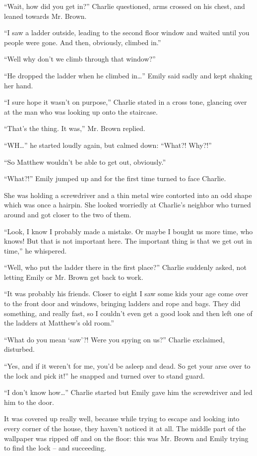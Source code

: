 “Wait, how did you get in?” Charlie questioned, arms crossed on his chest, and leaned towards Mr. Brown.

“I saw a ladder outside, leading to the second floor window and waited until you people were gone. And then, obviously, climbed in.”

“Well why don't we climb through that window?”

“He dropped the ladder when he climbed in…” Emily said sadly and kept shaking her hand.

“I sure hope it wasn't on purpose,” Charlie stated in a cross tone, glancing over at the man who was looking up onto the staircase.

“That's the thing. It was,” Mr. Brown replied.

“WH…” he started loudly again, but calmed down: “What?! Why?!”

“So Matthew wouldn't be able to get out, obviously.”

“What?!” Emily jumped up and for the first time turned to face Charlie.

She was holding a screwdriver and a thin metal wire contorted into an odd shape which was once a hairpin. She looked worriedly at Charlie's neighbor who turned around and got closer to the two of them.

“Look, I know I probably made a mistake. Or maybe I bought us more time, who knows! But that is not important here. The important thing is that we get out in time,” he whispered.

“Well, who put the ladder there in the first place?” Charlie suddenly asked, not letting Emily or Mr. Brown get back to work.

“It was probably his friends. Closer to eight I saw some kids your age come over to the front door and windows, bringing ladders and rope and bags. They did something, and really fast, so I couldn't even get a good look and then left one of the ladders at Matthew's old room.”

“What do you mean ‘saw'?! Were you spying on us?” Charlie exclaimed, disturbed.

“Yes, and if it weren't for me, you'd be asleep and dead. So get your arse over to the lock and pick it!” he snapped and turned over to stand guard.

“I don't know how…” Charlie started but Emily gave him the screwdriver and led him to the door.

It was covered up really well, because while trying to escape and looking into every corner of the house, they haven't noticed it at all. The middle part of the wallpaper was ripped off and on the floor: this was Mr. Brown and Emily trying to find the lock – and succeeding.

